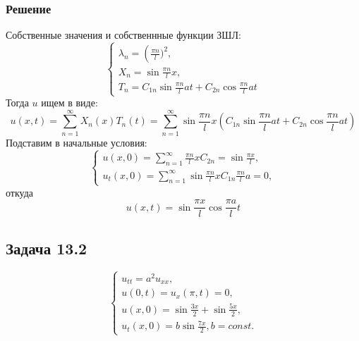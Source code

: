 \documentclass[11pt]{article}
\begin{document}
\subsubsection{Решение}
\label{sec:orgecce0e6}
Собственные значения и собственнные функции ЗШЛ:
\begin{equation}
\begin{cases}
\lambda_n = \left(\frac{\pi n}l)^2, \\
X_n = \sin\frac{\pi n}lx, \\
T_n = C_{1n}\sin\frac{\pi n}lat + C_{2n}\cos\frac{\pi n}lat
\end{cases}
\end{equation}
Тогда $u$ ищем в виде:
\begin{equation}
u(x, t) = \sum_{n = 1}^{\infty}X_n(x)T_n(t) =
\sum_{n = 1}^{\infty}\sin\frac{\pi n}lx\left(C_{1n}\sin\frac{\pi n}lat + C_{2n}\cos\frac{\pi n}lat\right)
\end{equation}
Подставим в начальные условия:
\begin{equation}
\begin{cases}
u(x, 0) = \sum_{n = 1}^{\infty}\frac{\pi n}lxC_{2n} = \sin\frac{\pi x}l, \\
u_t(x, 0) = \sum_{n = 1}^{\infty}\sin\frac{\pi n}lxC_{1n}\frac{\pi n}la = 0,
\end{cases}
\end{equation}
откуда
\begin{equation}
u(x, t) = \sin\frac{\pi x}l\cos\frac{\pi a}lt
\end{equation}
\subsection{Задача 13.2}
\label{sec:org4f6f02d}
\begin{equation}
\begin{cases}
u_{tt} = a^2u_{xx}, \\
u(0, t) = u_x(\pi, t) = 0, \\
u(x, 0) = \sin\frac{3x}2 + \sin\frac{5x}2, \\
u_t(x, 0) = b\sin\frac{7x}2, b = const.
\end{cases}
\end{equation}
\end{document}

